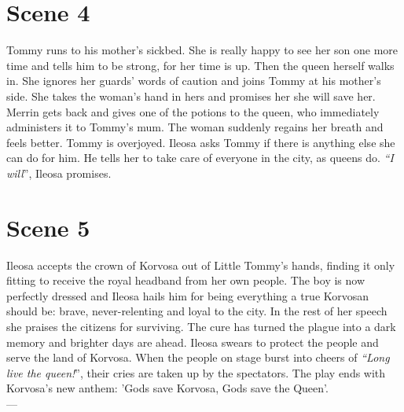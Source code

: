 \section{Scene 4}

Tommy runs to his mother's sickbed. She is really happy to see her son one more time and tells him to be strong, for her time is up. Then the queen herself walks in. She ignores her guards' words of caution and joins Tommy at his mother's side. She takes the woman's hand in hers and promises her she will save her. Merrin gets back and gives one of the potions to the queen, who immediately administers it to Tommy's mum. The woman suddenly regains her breath and feels better. Tommy is overjoyed. Ileosa asks Tommy if there is anything else she can do for him. He tells her to take care of everyone in the city, as queens do. {\itshape``I will}'', Ileosa promises.\\

\section{Scene 5}

Ileosa accepts the crown of Korvosa out of Little Tommy's hands, finding it only fitting to receive the royal headband from her own people. The boy is now perfectly dressed and Ileosa hails him for being everything a true Korvosan should be: brave, never-relenting and loyal to the city. In the rest of her speech she praises the citizens for surviving. The cure has turned the plague into a dark memory and brighter days are ahead. Ileosa swears to protect the people and serve the land of Korvosa. When the people on stage burst into cheers of {\itshape``Long live the queen!}'', their cries are taken up by the spectators. The play ends with Korvosa's new anthem: 'Gods save Korvosa, Gods save the Queen'.\\

---\\


